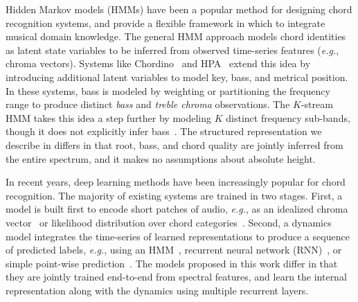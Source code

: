 \documentclass{article}
\def\eg{\emph{e.g.}}
\begin{document}
Hidden Markov models (HMMs) have been a popular method for designing chord recognition systems, and provide a flexible framework in which to integrate musical domain knowledge.
The general HMM approach models chord identities as latent state variables to be inferred from observed time-series features (\eg, chroma vectors).
Systems like Chordino~\cite{matthias2010a} and HPA~\cite{ni2012end} extend this idea by introducing additional latent variables to model key, bass, and metrical position.
In these systems, bass is modeled by weighting or partitioning the frequency range to produce distinct \emph{bass} and \emph{treble chroma} observations.
The $K$-stream HMM takes this idea a step further by modeling $K$ distinct frequency sub-bands, though it does not explicitly infer bass~\cite{cho2014improved}.
The structured representation we describe in  differs in that root, bass, and chord quality are jointly inferred from the entire spectrum, and it makes no assumptions about absolute height.



%   

In recent years, deep learning methods have been increasingly popular for chord recognition.
The majority of existing systems are trained in two stages. 
First, a model is built first to encode short patches of audio, \eg, as an idealized chroma vector~\cite{boulanger2013audio,korzeniowski2016feature} or likelihood distribution over chord categories~\cite{humphrey2015four,sigtia2015audio,zhou2015chord,deng2016hybrid}.
Second, a dynamics model integrates the time-series of learned representations to produce a sequence of predicted labels, \eg, using an HMM~\cite{humphrey2015four,zhou2015chord}, recurrent neural network (RNN)~\cite{boulanger2013audio,sigtia2015audio}, or simple point-wise prediction~\cite{korzeniowski2016feature}.
The models proposed in this work differ in that they are jointly trained end-to-end from spectral features, and learn the internal representation along with the dynamics using multiple recurrent layers.
\end{document}

